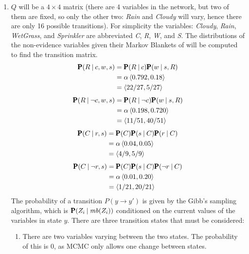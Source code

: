 \documentclass[a4paper, 12pt, one column, aas_macros]{article}
\newcommand\given[1][]{\:#1\vert\:}
\begin{document}
\begin{enumerate}[label=\alph*]
    \item
    	$Q$ will be a $4 \times 4$ matrix (there are 4 variables in the network, but two of them are fixed, so only the other two: \textit{Rain} and \textit{Cloudy} will vary, hence there are only 16 possible transitions). For simplicity the variables: \textit{Cloudy}, \textit{Rain}, \textit{WetGrass}, and \textit{Sprinkler} are abbreviated \textit{C}, \textit{R}, \textit{W}, and \textit{S}. The distributions of the non-evidence variables given their Markov Blankets of will be computed to find the transition matrix.
        \begin{align*}
        	\text{\pmb{P}}(R\given c, w, s) &= \text{\pmb{P}}(R\given c)\text{\pmb{P}}(w\given s, R) \\ 
            &= \alpha \braket{0.792, 0.18} \\
            &= \braket{22/27, 5/27}
        \end{align*}
        \begin{align*}
        	\text{\pmb{P}}(R\given \neg c, w, s) &= \text{\pmb{P}}(R\given \neg c)\text{\pmb{P}}(w\given s, R) \\ 
            &= \alpha \braket{0.198, 0.720} \\
            &= \braket{11/51, 40/51}
        \end{align*}
        \begin{align*}
        	\text{\pmb{P}}(C\given r, s) &= \text{\pmb{P}}(C)\text{\pmb{P}}(s\given C)\text{\pmb{P}}( r\given C) \\ 
            &= \alpha \braket{0.04, 0.05} \\
            &= \braket{4/9, 5/9}
        \end{align*}
        \begin{align*}
        	\text{\pmb{P}}(C\given \neg r, s) &= \text{\pmb{P}}(C)\text{\pmb{P}}(s\given C)\text{\pmb{P}}(\neg r\given C) \\ 
            &= \alpha \braket{0.01, 0.20} \\
            &= \braket{1/21, 20/21}
        \end{align*}
        The probability of a transition $P(y \rightarrow y')$ is given by the Gibb's sampling algorithm, which is $\text{\pmb{P}}(Z_{i}\given \mathit{mb}(Z_{i}))$ conditioned on the current values of the variables in state $y$. There are three transition states that must be considered: \begin{enumerate}
        \item There are two variables varying between the two states. The probability of this is 0, as MCMC only allows one change between states.

\end{enumerate}
\end{enumerate}
\end{document}
